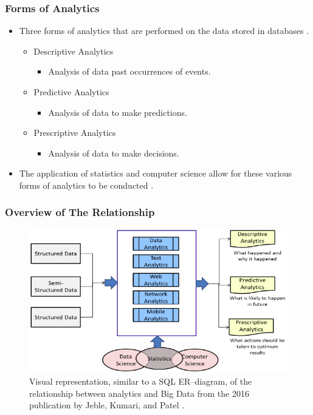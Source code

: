 \documentclass{beamer}
\begin{document}
\begin{frame}
\frametitle{Forms of Analytics}
\begin{itemize}
    \item Three forms of analytics that are performed on the data stored in databases \cite{Jeble2016}.
    \begin{itemize}
    \item Descriptive Analytics
        \begin{itemize}
        \item Analysis of data past occurrences of events.
        \end{itemize}
    \item Predictive Analytics
        \begin{itemize}
        \item  Analysis of data to make predictions.
        \end{itemize}
    \item Prescriptive Analytics
        \begin{itemize}
           \item Analysis of data to make decisions.
        \end{itemize}
    \end{itemize}
    \item The application of statistics and computer science allow for these various forms of analytics to be conducted \cite{Jeble2016}.
\end{itemize}
\end{frame}

\begin{frame}
\frametitle{Overview of The Relationship}
\begin{figure}
\includegraphics[scale=2]{BigDataDiagram}
\caption{Visual representation,  similar to a SQL ER--diagram, of the relationship between analytics and Big Data from the 2016 publication by Jeble, Kumari, and Patel \cite{Jeble2016}.}
\end{figure}
\end{frame}
\end{document}
